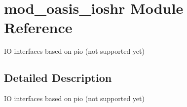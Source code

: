 \hypertarget{namespacemod__oasis__ioshr}{}\section{mod\+\_\+oasis\+\_\+ioshr Module Reference}
\label{namespacemod__oasis__ioshr}


IO interfaces based on pio (not supported yet)  




\subsection{Detailed Description}
IO interfaces based on pio (not supported yet) 